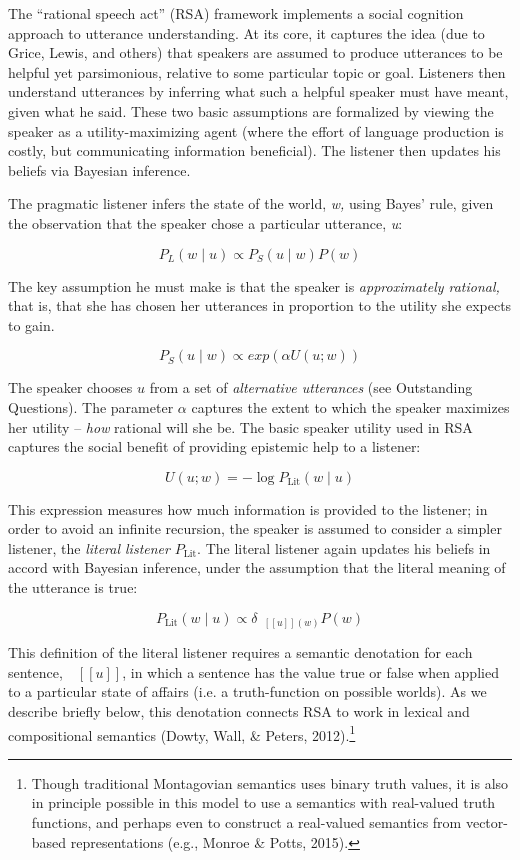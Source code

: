 \documentclass[]{elsarticle}
\newcommand{\denote}[1]{\mbox{ $[\![ #1 ]\!]$}}
\begin{document}
The ``rational speech act'' (RSA) framework implements a social
cognition approach to utterance understanding. At its core, it captures
the idea (due to Grice, Lewis, and others) that speakers are assumed to
produce utterances to be helpful yet parsimonious, relative to some
particular topic or goal. Listeners then understand utterances by
inferring what such a helpful speaker must have meant, given what he
said. These two basic assumptions are formalized by viewing the speaker
as a utility-maximizing agent (where the effort of language production
is costly, but communicating information beneficial). The listener then
updates his beliefs via Bayesian inference.

The pragmatic listener infers the state of the world, \emph{w,} using
Bayes' rule, given the observation that the speaker chose a particular
utterance, \emph{u}:

$$P_L(w\mid u) \propto P_S(u \mid w)P(w)$$

The key assumption he must make is that the speaker is
\emph{approximately rational,} that is, that she has chosen her
utterances in proportion to the utility she expects to gain.

$$P_S(u\mid w) \propto exp(\alpha
U(u;w))$$

The speaker chooses $u$ from a set of \emph{alternative utterances}
(see Outstanding Questions). The parameter $\alpha$
captures the extent to which the speaker maximizes her utility --
\emph{how} rational will she be. The basic speaker utility used in RSA
captures the social benefit of providing epistemic help to a listener:

$$U(u;w) = -\log P_{\text{Lit}}(w \mid u)$$

This expression measures how much information is provided to the
listener; in order to avoid an infinite recursion, the speaker is
assumed to consider a simpler listener, the \emph{literal listener}
$P_{\text{Lit}}$. The literal listener again updates his beliefs in
accord with Bayesian inference, under the assumption that the literal
meaning of the utterance is true:

$$P_{\text{Lit}}(w\mid u) \propto \delta_{\denote{u}(w)}P(w)$$

This definition of the literal listener requires a semantic denotation
for each sentence, $\denote{u}$, in which a sentence
has the value true or false when applied to a particular state of
affairs (i.e. a truth-function on possible worlds). As we describe
briefly below, this denotation connects RSA to work in lexical and
compositional semantics (Dowty, Wall, \& Peters, 2012).\footnote{Though
  traditional Montagovian semantics uses binary truth values, it is also
  in principle possible in this model to use a semantics with
  real-valued truth functions, and perhaps even to construct a
  real-valued semantics from vector-based representations (e.g., Monroe
  \& Potts, 2015).}
\end{document}
